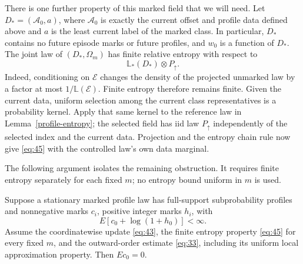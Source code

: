 There is one further property of this marked field that we will need.
Let $D_*=(\mathcal A_0,a)$, where $\mathcal A_0$ is exactly the
current offset and profile data defined above and $a$ is the least
current label of the marked class. In particular, $D_*$ contains no
future episode marks or future profiles, and $w_0$ is a function of
$D_*$. The joint law of $(D_*,\Omega_m)$ has finite relative entropy with respect to
\begin{equation*}\tag{45}\label{eq:45}
 \mathbb L_*(D_*)\otimes P_\uparrow.
\end{equation*}
Indeed, conditioning on $\mathcal E$ changes the density of the projected
unmarked law by a factor at most $1/\mathbb L(\mathcal E)$. Finite entropy
therefore remains finite. Given the current data, uniform selection
among the current class representatives is a probability kernel. Apply
that same kernel to the reference law in Lemma~\ref{profile-entropy};
the selected field has iid law $P_\uparrow$ independently of the selected
index and the current data. Projection and the entropy chain rule now
give \eqref{eq:45} with the controlled law's own data
marginal.

The following argument isolates the remaining obstruction. It requires
finite entropy separately for each fixed $m$; no entropy bound uniform
in $m$ is used.

\begin{proposition}
\label{profile-no-growth}
Suppose a stationary marked profile law has full-support subprobability
profiles and nonnegative marks $c_i$, positive integer marks $h_i$, with
\[
 E[c_0+\log(1+h_0)]<\infty.
\]
Assume the coordinatewise update \eqref{eq:43}, the finite
entropy property \eqref{eq:45} for every fixed $m$, and
the outward-order estimate \eqref{eq:33}, including its uniform local
approximation property. Then $Ec_0=0$.
\end{proposition}

